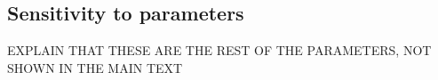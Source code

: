 \documentclass[12pt, oneside]{article}   	%
\begin{document}




\subsection{Sensitivity to parameters}

EXPLAIN THAT THESE ARE THE REST OF THE PARAMETERS, NOT SHOWN IN THE MAIN TEXT
\end{document}
